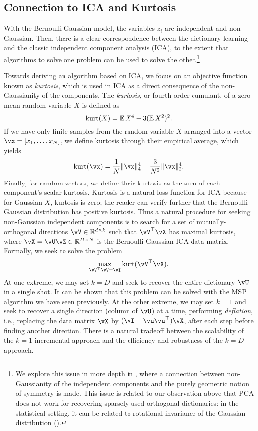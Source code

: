 \documentclass[../../book-main.tex]{subfiles}
\begin{document}
\subsection{Connection to ICA and Kurtosis}
With the Bernoulli-Gaussian model, the variables $z_i$ are independent and non-Gaussian. Then, there is a clear correspondence between the dictionary learning and the classic independent component analysis (ICA), to the extent that algorithms to solve one problem can be used to solve the other.\footnote{We explore this issue in more depth in , where a connection between non-Gaussianity of the independent components and the purely geometric notion of symmetry is made. This issue is related to our observation above that PCA does not work for recovering sparsely-used orthogonal dictionaries: in the statistical setting, it can be related to rotational invariance of the Gaussian distribution ().} 


Towards deriving an algorithm based on ICA, we focus on an objective function known as \textit{kurtosis}, which is used in ICA as a direct consequence of the non-Gaussianity of the components. The \textit{kurtosis}, or fourth-order cumulant, of a zero-mean random variable $X$ is defined as
\begin{equation}\label{eq:kurtosis}
\mathop{\mathrm{kurt}}(X) = \operatorname{\mathbb{E}}{X^4} - 3 (\operatorname{\mathbb{E}}{X^2})^2.
\end{equation}
If we have only finite samples from the random variable $X$ arranged into a vector $\vx = [x_1, \dots, x_N]$, we define kurtosis through their empirical average, which yields
\begin{equation}\label{eq:kurtosis-vector}
\kurt(\vx) = \frac{1}{N} \norm{\vx}_4^4 - \frac{3}{N^2} \norm{\vx}_2^4.
\end{equation}
Finally, for random vectors, we define their kurtosis as the sum of each component's scalar kurtosis.
Kurtosis is a natural loss function for ICA because for Gaussian $X$, kurtosis is zero; the reader can verify further that the Bernoulli-Gaussian distribution has positive kurtosis. 
Thus a natural procedure for seeking non-Gaussian independent components is to search for a set of mutually-orthogonal directions $\vV \in \R^{d \times k}$ such that $\vV^\top \vX$ has maximal kurtosis, where $\vX = \vU \vZ \in \R^{D \times N}$ is the Bernoulli-Gaussian ICA data matrix.
Formally, we seek to solve the problem
\begin{equation}
    \max_{\vV^\top \vV = \vI} \kurt(\vV^\top \vX).
\end{equation}
At one extreme, we may set $k = D$ and seek to recover the entire dictionary
$\vU$ in a single shot.  It can be shown that this problem can be solved with
the MSP algorithm we have seen previously. 
At the other extreme, we may set $k=1$ and seek to recover a single direction (column of $\vU$) at a time, performing \textit{deflation}, i.e., replacing the data matrix $\vX$ by $(\vI - \vu\vu^\top) \vX$, after each step before finding another direction.
There is a natural tradeoff between the scalability of the $k=1$ incremental approach and the efficiency and robustness of the $k=D$ approach. 
\end{document}
